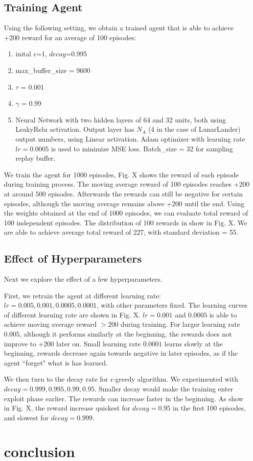 \documentclass[conference]{IEEEtran}
\begin{document}
\subsection{Training Agent}
Using the following setting, we obtain a trained agent that is able to achieve +200 reward for an average of 100 episodes:
\begin{enumerate}
\item inital $\epsilon$=1, $decay$=0.995
\item max\_buffer\_size = 9600
\item $\tau$ = 0.001
\item $\gamma$ = 0.99
\item Neural Network with two hidden layers of 64 and 32 units, both using LeakyRelu activation. Output layer has $N_A$ (4 in the case of LunarLander) output numbers, using Linear activation. Adam optimizer with learning rate $lr=0.0005$ is used to minimize MSE loss. Batch\_size = 32 for sampling replay buffer.
\end{enumerate}
We train the agent for 1000 episodes, Fig. X shows the reward of each episode during training process. The moving average reward of 100 episodes reaches +200 at around 500 episodes. Afterwards the rewards can still be negative for certain episodes, although the moving average remains above +200 until the end. Using the weights obtained at the end of 1000 episodes, we can evaluate total reward of 100 independent episodes. The distribution of 100 rewards in show in Fig. X. We are able to achieve average total reward of 227, with standard deviation = 55.

\subsection{Effect of Hyperparameters}
Next we explore the effect of a few hyperparameters.

First, we retrain the agent at different learning rate: $lr = 0.005, 0.001, 0.0005, 0.0001$, with other parameters fixed. The learning curves of different learning rate are shown in Fig. X. $lr = 0.001$ and $0.0005$ is able to achieve moving average reward $>200$ during training. For larger learning rate $0.005$, although it performs similarly at the beginning, the rewards does not improve to +200 later on. Small learning rate $0.0001$ learns slowly at the beginning, rewards decrease again towards negative in later episodes, as if the agent ``forget" what is has learned. 

We then turn to the decay rate for $\epsilon$-greedy algorithm. We experimented with $decay = 0.999, 0.995, 0.99, 0.95$. Smaller decay would make the training enter exploit phase earlier. The rewards can increase faster in the beginning. As show in Fig. X, the reward increase quickest for $decay = 0.95$ in the first 100 episodes, and slowest for $decay = 0.999$. 
	
\section{conclusion}


	


\end{document}
